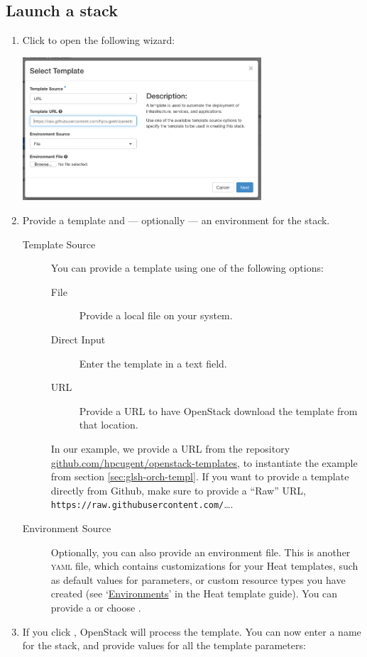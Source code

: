 \subsection*{Launch a stack}
\begin{enumerate}
\item Click  to open the following wizard:
\begin{center}
  \includegraphics[width=0.7\textwidth]{img/launch_stack_template}
\end{center}
\item Provide a template and --- optionally --- an environment for the stack.
\begin{description}
\item[Template Source] You can provide a template using one of the
  following options:
  \begin{description}
  \item[File] Provide a local file on your system.
  \item[Direct Input] Enter the template in a text field.
  \item[URL] Provide a \textsc{URL} to have OpenStack download the
    template from that location.
  \end{description}
  In our example, we provide a \textsc{URL} from the repository
  \href{https://github.com/hpcugent/openstack-templates}{github.com/hpcugent/openstack-templates},
  to instantiate the example from section \ref{sec:glsh-orch-templ}.
  If you want to provide a template directly from Github, make sure to
  provide a ``Raw'' \textsc{URL},
  \lstinline{https://raw.githubusercontent.com/}\ldots.

\item[Environment Source] Optionally, you can also provide an
  environment file.  This is another \textsc{yaml} file, which
  contains customizations for your Heat templates, such as default
  values for parameters, or custom resource types you have created
  (see
  `\href{https://docs.openstack.org/heat/\osversion/template_guide/environment.html}{Environments}'
  in the Heat template guide).  You can provide a  or
  choose .
\end{description}
\item If you click , OpenStack will process the template.
  You can now enter a name for the stack, and provide values for all
  the template parameters:


\end{enumerate}
